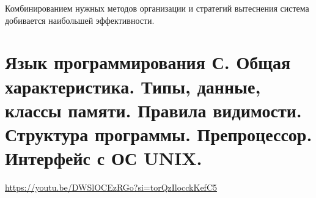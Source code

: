 \documentclass[a4paper,12pt,titlepage,finall]{article}
\begin{document}
Комбинированием нужных методов организации и стратегий вытеснения система добивается наибольшей эффективности.

\section{Язык программирования С. Общая характеристика. Типы, данные, классы памяти. Правила
видимости. Структура программы. Препроцессор. Интерфейс с ОС UNIX.}

\url{https://youtu.be/DWSlOCEzRGo?si=torQzIlocckKefC5}
\end{document}
